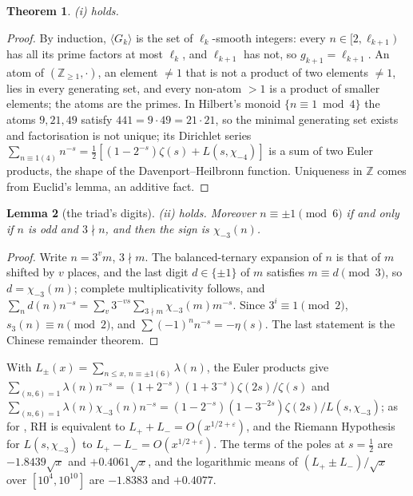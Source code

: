 \documentclass[11pt]{article}
\newtheorem{theorem}{Theorem}[section]
\newtheorem{lemma}[theorem]{Lemma}
\theoremstyle{definition}\newtheorem{definition}[theorem]{Definition}
\theoremstyle{remark}\newtheorem{remark}[theorem]{Remark}
\begin{document}
\begin{theorem}\label{thm:gen}
(i) holds.
\end{theorem}
\begin{proof}
By induction, $\langle G_k\rangle$ is the set of $\ell_k$-smooth integers: every $n\in[2,\ell_{k+1})$ has all its prime factors at most $\ell_k$, and $\ell_{k+1}$ has not, so $g_{k+1}=\ell_{k+1}$. An atom of $(\mathbb Z_{\ge1},\cdot)$, an element $\ne1$ that is not a product of two elements $\ne1$, lies in every generating set, and every non-atom $>1$ is a product of smaller elements; the atoms are the primes. In Hilbert's monoid $\{n\equiv1\bmod4\}$ the atoms $9,21,49$ satisfy $441=9\cdot49=21\cdot21$, so the minimal generating set exists and factorisation is not unique; its Dirichlet series $\sum_{n\equiv1(4)}n^{-s}=\frac12[(1-2^{-s})\zeta(s)+L(s,\chi_{-4})]$ is a sum of two Euler products, the shape of the Davenport--Heilbronn function. Uniqueness in $\mathbb Z$ comes from Euclid's lemma, an additive fact.
\end{proof}

\begin{lemma}[the triad's digits]\label{lem:digits}
(ii) holds. Moreover $n\equiv\pm1\pmod6$ if and only if $n$ is odd and $3\nmid n$, and then the sign is $\chi_{-3}(n)$.
\end{lemma}
\begin{proof}
Write $n=3^vm$, $3\nmid m$. The balanced-ternary expansion of $n$ is that of $m$ shifted by $v$ places, and the last digit $d\in\{\pm1\}$ of $m$ satisfies $m\equiv d\pmod3$, so $d=\chi_{-3}(m)$; complete multiplicativity follows, and $\sum_nd(n)n^{-s}=\sum_v3^{-vs}\sum_{3\nmid m}\chi_{-3}(m)m^{-s}$. Since $3^i\equiv1\pmod2$, $s_3(n)\equiv n\pmod2$, and $\sum(-1)^nn^{-s}=-\eta(s)$. The last statement is the Chinese remainder theorem.
\end{proof}

With $L_\pm(x)=\sum_{n\le x,\,n\equiv\pm1(6)}\lambda(n)$, the Euler products give $\sum_{(n,6)=1}\lambda(n)n^{-s}=(1+2^{-s})(1+3^{-s})\zeta(2s)/\zeta(s)$ and $\sum_{(n,6)=1}\lambda(n)\chi_{-3}(n)n^{-s}=(1-2^{-s})(1-3^{-2s})\zeta(2s)/L(s,\chi_{-3})$; as for \cite[Prop.~3.1]{S01}, RH is equivalent to $L_++L_-=O(x^{1/2+\varepsilon})$, and the Riemann Hypothesis for $L(s,\chi_{-3})$ to $L_+-L_-=O(x^{1/2+\varepsilon})$. The terms of the poles at $s=\frac12$ are $-1.8439\sqrt x$ and $+0.4061\sqrt x$, and the logarithmic means of $(L_+\pm L_-)/\sqrt x$ over $[10^4,10^{10}]$ are $-1.8383$ and $+0.4077$.
\end{document}
